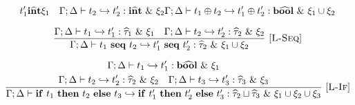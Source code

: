 \documentclass{llncs}
\newcommand{\VER}{\\[1.5ex]}
\newcommand{\Rule}[3]{\frac{#2}{#3}\mbox{\ [\textsc{#1}]}}
\newcommand{\ExnTy}{\widehat\tau}
\newcommand{\ExnTyBool}{\mathrm{b\widehat{oo}l}}    %
\newcommand{\Exn}{\xi}
\newcommand{\ExnUnion}[2]{#1 \cup #2}
\newcommand{\ExnBool}{\mathbf{b\widehat{oo}l}}      %
\newcommand{\ExnInt}{\mathbf{i\widehat{n}t}}        %
\newcommand{\Tm}{t}
\newcommand{\TmOp}[2]{#1 \oplus #2}
\newcommand{\TmIf}[3]{\mathbf{if}\ #1\ \mathbf{then}\ #2\ \mathbf{else}\ #3}
\newcommand{\TmSeq}[2]{#1\ \mathbf{seq}\ #2}
\newcommand{\TyJoin}[2]{#1 \sqcup #2}
\newcommand{\TyEnv}{\Gamma}
\newcommand{\KiEnv}{\Delta}
\newcommand{\JudgeElab}[6]{{#1; #2 \vdash #3 \hookrightarrow #4 : #5\ \&\ #6}}
\begin{document}
\begin{figure*}[p]
\begin{gather*}
{                        {\Tm_1^\prime}
                        {\ExnInt}
                        {\Exn_1}
              \quad
              \JudgeElab{\TyEnv}
                        {\KiEnv}
                        {\Tm_2}
                        {\Tm_2^\prime}
                        {\ExnInt}
                        {\Exn_2}
             }
             {\JudgeElab{\TyEnv}
                        {\KiEnv}
                        {\TmOp{\Tm_1}{\Tm_2}}
                        {\TmOp{\Tm_1^\prime}{\Tm_2^\prime}}
                        {\ExnBool}
                        {\ExnUnion{\Exn_1}{\Exn_2}}
             }
        \VER
        \Rule{L-Seq}
             {\JudgeElab{\TyEnv}
                        {\KiEnv}
                        {\Tm_1}
                        {\Tm_1^\prime}
                        {\ExnTy_1}
                        {\Exn_1}
              \quad
              \JudgeElab{\TyEnv}
                        {\KiEnv}
                        {\Tm_2}
                        {\Tm_2^\prime}
                        {\ExnTy_2}
                        {\Exn_2}
             }
             {\JudgeElab{\TyEnv}
                        {\KiEnv}
                        {\TmSeq{\Tm_1}{\Tm_2}}
                        {\TmSeq{\Tm_1^\prime}{\Tm_2^\prime}}
                        {\ExnTy_2}
                        {\ExnUnion{\Exn_1}{\Exn_2}}
             }
        \VER
        \Rule{L-If}
             {\begin{gathered}
                  \JudgeElab{\TyEnv}
                            {\KiEnv}
                            {\Tm_1}
                            {\Tm_1^\prime}
                            {\ExnBool}
                            {\Exn_1}
                  \\
                  \JudgeElab{\TyEnv}
                            {\KiEnv}
                            {\Tm_2}
                            {\Tm_2^\prime}
                            {\ExnTy_2}
                            {\Exn_2}
                  \quad
                  \JudgeElab{\TyEnv}
                            {\KiEnv}
                            {\Tm_3}
                            {\Tm_3^\prime}
                            {\ExnTy_3}
                            {\Exn_3}
             \end{gathered}}
             {\JudgeElab{\TyEnv}
                        {\KiEnv}
                        {\TmIf{\Tm_1}{\Tm_2}{\Tm_3}}
                        {\TmIf{\Tm_1^\prime}{\Tm_2^\prime}{\Tm_3^\prime}}
                        {\TyJoin{\ExnTy_2}{\ExnTy_3}}
                        {\ExnUnion{\Exn_1}{\ExnUnion{\Exn_2}{\Exn_3}}}
}
\end{gather*}
\end{figure*}
\end{document}
